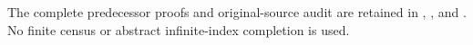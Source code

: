 \begingroup\footnotesize\raggedright
The complete predecessor proofs and original-source audit are retained
in ,
, and
.
No finite census or abstract infinite-index completion is used.
\par\endgroup
